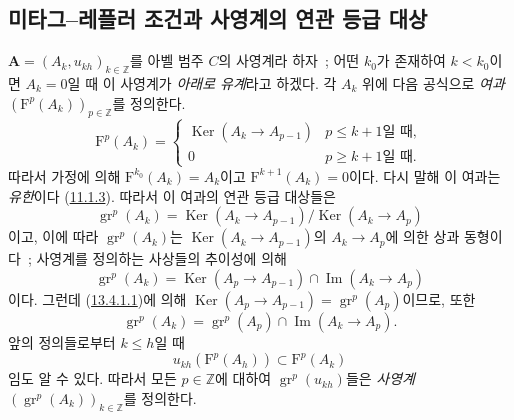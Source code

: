 \subsection{미타그--레플러 조건과 사영계의 연관 등급 대상}
\label{subsection:0.13.4-fr}
\label{0.13.4-fr}

\begin{env}[13.4.1]
\label{0.13.4.1-fr}
$\mathbf A=(A_k,u_{kh})_{k\in\mathbb Z}$를 아벨 범주 $C$의 사영계라
하자~; 어떤 $k_0$가 존재하여 $k<k_0$이면 $A_k=0$일 때 이 사영계가
\emph{아래로 유계}라고 하겠다. 각 $A_k$ 위에 다음 공식으로
\emph{여과} $(\mathrm F^p(A_k))_{p\in\mathbb Z}$를 정의한다.
\begin{equation}
\label{0.13.4.1.1-fr}
\tag{13.4.1.1}
\mathrm F^p(A_k)=
\begin{cases}
\operatorname{Ker}(A_k\longrightarrow A_{p-1})&\text{$p\leq k+1$일 때},\\
0&\text{$p\geq k+1$일 때}.
\end{cases}
\end{equation}
따라서 가정에 의해 $\mathrm F^{k_0}(A_k)=A_k$이고
$\mathrm F^{k+1}(A_k)=0$이다. 다시 말해 이 여과는 \emph{유한}이다
(\hyperref[0.11.1.3-fr]{11.1.3}). 따라서 이 여과의 연관 등급 대상들은
\[
\operatorname{gr}^p(A_k)=
\operatorname{Ker}(A_k\longrightarrow A_{p-1})
/\operatorname{Ker}(A_k\longrightarrow A_p)
\]
이고, 이에 따라 $\operatorname{gr}^p(A_k)$는
$\operatorname{Ker}(A_k\to A_{p-1})$의 $A_k\to A_p$에 의한 상과
동형이다~; 사영계를 정의하는 사상들의 추이성에 의해
\begin{equation}
\label{0.13.4.1.2-fr}
\tag{13.4.1.2}
\operatorname{gr}^p(A_k)=
\operatorname{Ker}(A_p\longrightarrow A_{p-1})
\cap\operatorname{Im}(A_k\longrightarrow A_p)
\end{equation}
이다. 그런데 (\hyperref[0.13.4.1.1-fr]{13.4.1.1})에 의해
$\operatorname{Ker}(A_p\to A_{p-1})=\operatorname{gr}^p(A_p)$이므로,
또한
\begin{equation}
\label{0.13.4.1.3-fr}
\tag{13.4.1.3}
\operatorname{gr}^p(A_k)=
\operatorname{gr}^p(A_p)\cap\operatorname{Im}(A_k\longrightarrow A_p).
\end{equation}
앞의 정의들로부터 $k\leq h$일 때
\[
u_{kh}(\mathrm F^p(A_h))\subset\mathrm F^p(A_k)
\]
임도 알 수 있다. 따라서 모든 $p\in\mathbb Z$에 대하여
$\operatorname{gr}^p(u_{kh})$들은 \emph{사영계}
$(\operatorname{gr}^p(A_k))_{k\in\mathbb Z}$를 정의한다.
\end{env}

